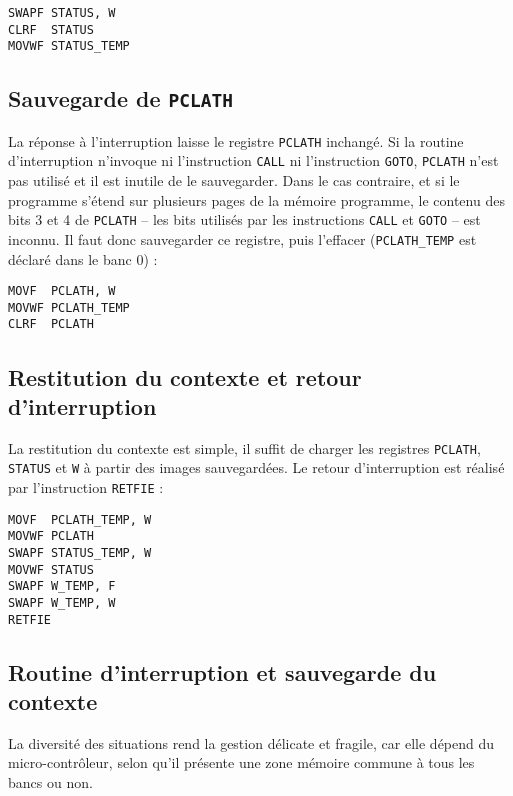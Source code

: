 \begin{lstlisting}[language=assembleur]
SWAPF STATUS, W
CLRF  STATUS
MOVWF STATUS_TEMP 
\end{lstlisting}

\subsection{Sauvegarde de \texttt{PCLATH}}

La réponse à l'interruption laisse le registre \texttt{PCLATH} inchangé. Si la routine d'interruption n'invoque ni l'instruction \texttt{CALL} ni l'instruction \texttt{GOTO}, \texttt{PCLATH} n'est pas utilisé et il est inutile de le sauvegarder. Dans le cas contraire, et si le programme s'étend sur plusieurs pages de la mémoire programme, le contenu des bits 3 et 4 de \texttt{PCLATH} -- les bits utilisés par les instructions \texttt{CALL} et \texttt{GOTO} -- est inconnu. Il faut donc sauvegarder ce registre, puis l'effacer (\texttt{PCLATH\_TEMP} est déclaré dans le banc 0) :

\begin{lstlisting}[language=assembleur]
MOVF  PCLATH, W
MOVWF PCLATH_TEMP 
CLRF  PCLATH
\end{lstlisting}




\subsection{Restitution du contexte et retour d'interruption}

La restitution du contexte est simple, il suffit de charger les registres \texttt{PCLATH}, \texttt{STATUS} et \texttt{W} à partir des images sauvegardées. Le retour d'interruption est réalisé par l'instruction \texttt{RETFIE} :

\begin{lstlisting}[language=assembleur]
MOVF  PCLATH_TEMP, W
MOVWF PCLATH 
SWAPF STATUS_TEMP, W
MOVWF STATUS
SWAPF W_TEMP, F
SWAPF W_TEMP, W
RETFIE
\end{lstlisting}


\subsection{Routine d’interruption et sauvegarde du contexte}

La diversité des situations rend la gestion délicate et fragile, car elle dépend du micro-contrôleur, selon qu'il présente une zone mémoire commune à tous les bancs ou non.

